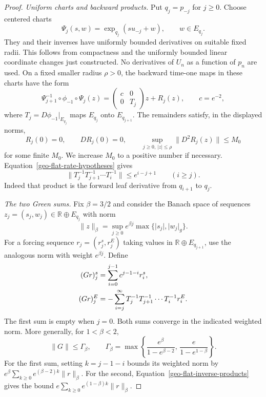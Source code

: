 \begin{proof}
\emph{Uniform charts and backward products.}
Put $q_j=p_{-j}$ for $j\geq0$.  Choose centered charts
\[
 \Psi_j(s,w)=\exp_{q_j}(s u_{-j}+w),\qquad w\in E_{q_j}.
\]
They and their inverses have uniformly bounded derivatives on suitable
fixed radii.  This follows from compactness and the uniformly bounded
linear coordinate changes just constructed.  No derivatives of $U_n$
as a function of $p_n$ are used.  On a fixed smaller radius $\rho>0$,
the backward time-one maps in these charts have the form
\begin{equation}
\label{geo-flat-backward-maps}
 \Psi_{j+1}^{-1}\circ\phi_{-1}\circ\Psi_j(z)
 =\begin{pmatrix}c&0\\0&T_j\end{pmatrix}z+R_j(z),
 \qquad c=e^{-2},
\end{equation}
where $T_j=D\phi_{-1}|_{E_{q_j}}$ maps $E_{q_j}$ onto $E_{q_{j+1}}$.
The remainders satisfy, in the displayed norms,
\begin{equation}
\label{geo-flat-remainders}
 R_j(0)=0,\qquad DR_j(0)=0,\qquad
 \sup_{j\geq0,\,\lvert z\rvert\leq\rho}
 \lVert D^2R_j(z)\rVert\leq M_0
\end{equation}
for some finite $M_0$.  We increase $M_0$ to a positive number if
necessary.  Equation~\eqref{geo-flat-rate-hypotheses} gives
\begin{equation}
\label{geo-flat-inverse-products}
 \bigl\lVert T_j^{-1}T_{j+1}^{-1}\cdots T_i^{-1}\bigr\rVert
 \leq e^{i-j+1}\qquad(i\geq j).
\end{equation}
Indeed that product is the forward leaf derivative from $q_{i+1}$ to
$q_j$.

\emph{The two Green sums.}
Fix $\beta=3/2$ and consider the Banach space of sequences
$z_j=(s_j,w_j)\in\mathbb R\oplus E_{q_j}$ with norm
\[
 \lVert z\rVert_\beta
 =\sup_{j\geq0}e^{\beta j}\max\{\lvert s_j\rvert,\lvert w_j\rvert_g\}.
\]
For a forcing sequence $r_j=(r_j^s,r_j^E)$ taking values in
$\mathbb R\oplus E_{q_{j+1}}$, use the analogous norm with weight
$e^{\beta j}$.  Define
\begin{align}
\label{geo-flat-green-sums}
 (Gr)^s_j
 &=\sum_{i=0}^{j-1}c^{j-1-i}r_i^s,\\
 (Gr)^E_j
 &=-\sum_{i=j}^{\infty}
 T_j^{-1}T_{j+1}^{-1}\cdots T_i^{-1}r_i^E.
 \notag
\end{align}
The first sum is empty when $j=0$.  Both sums converge in the indicated
weighted norm.  More generally, for $1<\beta<2$,
\begin{equation}
\label{geo-flat-green-bound}
 \lVert G\rVert\leq\Gamma_\beta,
 \qquad
 \Gamma_\beta=\max\left\{
 \frac{e^\beta}{1-e^{\beta-2}},\,
 \frac{e}{1-e^{1-\beta}}\right\}.
\end{equation}
For the first sum, setting $k=j-1-i$ bounds its weighted norm by
$e^\beta\sum_{k\geq0}e^{(\beta-2)k}\lVert r\rVert_\beta$.
For the second, Equation~\eqref{geo-flat-inverse-products} gives the
bound $e\sum_{k\geq0}e^{(1-\beta)k}\lVert r\rVert_\beta$.


\end{proof}
